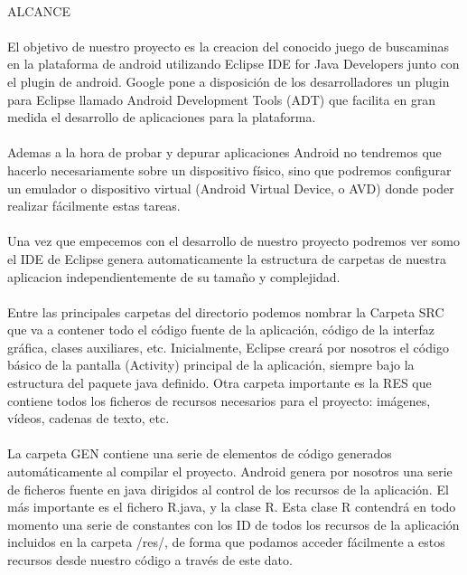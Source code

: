 \documentclass[../documentacion_buscaminas2013.tex]{subfiles}
\begin{document}
\paragraph{ } ALCANCE

\paragraph{ }
El objetivo de nuestro proyecto es la creacion del conocido juego de buscaminas en la plataforma de android utilizando Eclipse IDE for Java Developers junto con el plugin de android. Google pone a disposición de los desarrolladores un plugin para Eclipse llamado Android Development Tools (ADT) que facilita en gran medida el desarrollo de aplicaciones para la plataforma. 

\paragraph{ }
Ademas a la hora de probar y depurar aplicaciones Android no tendremos que hacerlo necesariamente sobre un dispositivo físico, sino que podremos configurar un emulador o dispositivo virtual (Android Virtual Device, o AVD) donde poder realizar fácilmente estas tareas.

\paragraph{ }
Una vez que empecemos con el desarrollo de nuestro proyecto podremos ver somo el IDE de Eclipse genera automaticamente la estructura de carpetas de nuestra aplicacion independientemente de su tamaño y complejidad. 

\paragraph{ }
Entre las principales carpetas del directorio podemos nombrar la Carpeta SRC que va a contener todo el código fuente de la aplicación, código de la interfaz gráfica, clases auxiliares, etc. Inicialmente, Eclipse creará por nosotros el código básico de la pantalla (Activity) principal de la aplicación, siempre bajo la estructura del paquete java definido.  Otra carpeta importante es la RES que contiene todos los ficheros de recursos necesarios para el proyecto: imágenes, vídeos, cadenas de texto, etc.

\paragraph{ }
La carpeta GEN contiene una serie de elementos de código generados automáticamente al compilar el proyecto. Android genera por nosotros una serie de ficheros fuente en java dirigidos al control de los recursos de la aplicación. El más importante es  el fichero R.java, y la clase R. Esta clase R contendrá en todo momento una serie de constantes con los ID de todos los recursos de la aplicación incluidos en la carpeta /res/, de forma que podamos acceder fácilmente a estos recursos desde nuestro código a través de este dato. 
\end{document}

